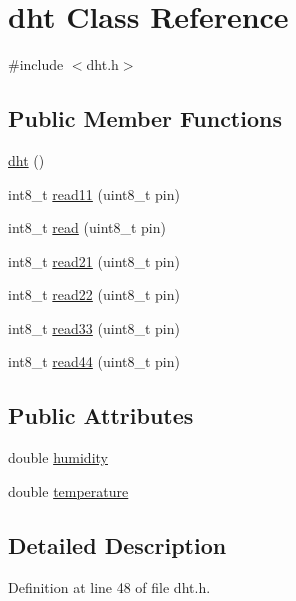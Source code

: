 \hypertarget{classdht}{}\section{dht Class Reference}
\label{classdht}


{\ttfamily \#include $<$dht.\+h$>$}

\subsection*{Public Member Functions}
\begin{DoxyCompactItemize}
\item 
\hyperlink{classdht_afa0d349662e745a3250dee1bb4481d1c}{dht} ()
\item 
int8\+\_\+t \hyperlink{classdht_a896a06f6dcf5873c7209db2072f3a0ea}{read11} (uint8\+\_\+t pin)
\item 
int8\+\_\+t \hyperlink{classdht_a71cd6a9699aacbb5ec74cab3940648d2}{read} (uint8\+\_\+t pin)
\item 
int8\+\_\+t \hyperlink{classdht_a3e641d254dfd02ccc3371ed1882749b9}{read21} (uint8\+\_\+t pin)
\item 
int8\+\_\+t \hyperlink{classdht_a3d8e3274a408da4faf97dc51f2eedd37}{read22} (uint8\+\_\+t pin)
\item 
int8\+\_\+t \hyperlink{classdht_a42a56c5aedafb905b202da15ff5613f0}{read33} (uint8\+\_\+t pin)
\item 
int8\+\_\+t \hyperlink{classdht_ae9fd6de170d0eb9f3722ab1a67339332}{read44} (uint8\+\_\+t pin)
\end{DoxyCompactItemize}
\subsection*{Public Attributes}
\begin{DoxyCompactItemize}
\item 
double \hyperlink{classdht_affe25f21f3b909fbaa662da36335e0ac}{humidity}
\item 
double \hyperlink{classdht_aa3316caeac26d1f47d0fc393db60c916}{temperature}
\end{DoxyCompactItemize}


\subsection{Detailed Description}


Definition at line 48 of file dht.\+h.



